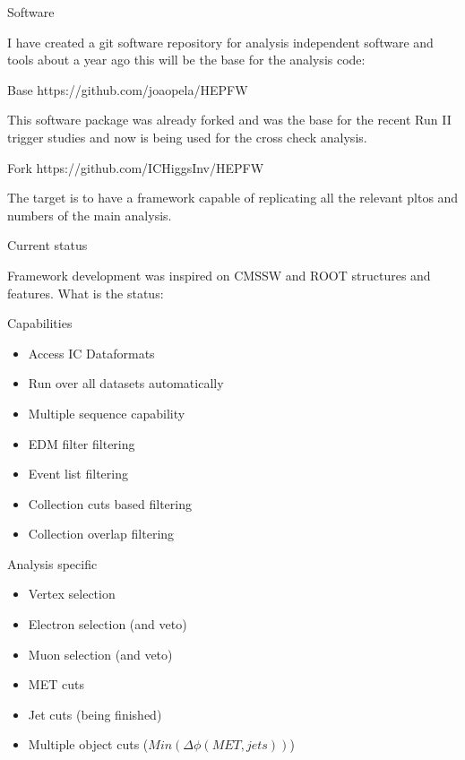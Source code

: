 \documentclass[8pt]{beamer}
\begin{document}
\begin{frame}{Software}

I have created a git software repository for analysis independent software and tools about a year ago this will be the base for the analysis code:
\begin{block}{Base}
https://github.com/joaopela/HEPFW
\end{block}

This software package was already forked and was the base for the recent Run II trigger studies and now is being used for the cross check analysis.
\begin{block}{Fork}
https://github.com/ICHiggsInv/HEPFW
\end{block}

The target is to have a framework capable of replicating all the relevant pltos and numbers of the main analysis.

\end{frame}

\begin{frame}{Current status}
 
Framework development was inspired on CMSSW and ROOT structures and features. What is the status:
 
\begin{block}{Capabilities}
 
  \begin{itemize}
   \item Access IC Dataformats
   \item Run over all datasets automatically
   \item Multiple sequence capability
   \item EDM filter filtering
   \item Event list filtering
   \item Collection cuts based filtering
   \item Collection overlap filtering
  \end{itemize}

\end{block}
 
\begin{block}{Analysis specific}

  \begin{itemize}
   \item Vertex selection
   \item Electron selection (and veto)
   \item Muon selection (and veto)
   \item MET cuts
   \item Jet cuts (being finished)
   \item Multiple object cuts ($Min(\Delta\phi(MET,jets))$)
  \end{itemize}

\end{block}
 
\end{frame}
\end{document}
